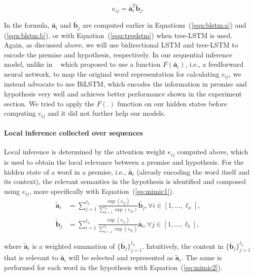 \documentclass[11pt,a4paper]{article}
\newcommand{\vect}[1]{\mathbf{#1}}
\begin{document}
\begin{equation}
e_{ij} = \bar{\vect{a}}_i^T \bar{\vect{b}}_j.
\label{equ:e}
\end{equation}

In the formula, $\bar{\vect{a}}_i$ and $\bar{\vect{b}}_j$ are computed earlier in Equations~(\ref{equ:blstm:a}) and (\ref{equ:blstm:b}), or with Equation~(\ref{equ:treelstm}) when tree-LSTM is used. Again, as discussed above, we will use  bidirectional LSTM and tree-LSTM to encode the premise and hypothesis, respectively. In our sequential inference model, unlike in ~\citet{Parikh:D16-1244} which proposed to use a function $F(\bar{\vect{a}}_i)$, i.e., a feedforward neural network, to map the original word representation for calculating $e_{ij}$, we instead advocate to use BiLSTM, which encodes the information in premise and hypothesis very well and achieves better performance shown in the experiment section. We tried to apply the $F(.)$ function on our hidden states before computing $e_{ij}$ and it did not further help our models. 

\paragraph{Local inference collected over sequences}

Local inference is determined by the attention weight $e_{ij}$ computed above, which is used to obtain the local relevance between a premise and hypothesis. For the hidden state of a word in a premise, i.e., $\bar{\vect{a}}_i$ (already encoding the word itself and its context), the relevant semantics in the hypothesis is identified and composed using $e_{ij}$, more specifically with Equation~(\ref{eq:mimic1}).
{\fontsize{10pt}{1.0cm}
	\begin{align}
    \label{eq:mimic1}
		\tilde{\vect{a}}_i &=\sum_{j=1}^{\ell_b}\frac{\exp(e_{ij})}{\sum_{k=1}^{\ell_b}\exp(e_{ik})} \bar{\vect{b}}_j, \forall i \in [1, \dots, \ell_a], \\
		\tilde{\vect{b}}_j &=\sum_{i=1}^{\ell_a}\frac{\exp(e_{ij})}{\sum_{k=1}^{\ell_a}\exp(e_{kj})} \bar{\vect{a}}_i, \forall j \in [1, \dots, \ell_b],
    \label{eq:mimic2}
	\end{align}
}

\noindent where $\tilde{\vect{a}}_i$ is a weighted summation of $\{\bar{\vect{b}}_j\}_{j=1}^{\ell_b}$. Intuitively, the content in $\{\bar{\vect{b}}_j\}_{j=1}^{\ell_b}$ that is relevant to $\bar{\vect{a}}_i$ will be selected and represented as $\tilde{\vect{a}}_i$. The same is performed for each word in the hypothesis with Equation~(\ref{eq:mimic2}).
\end{document}
